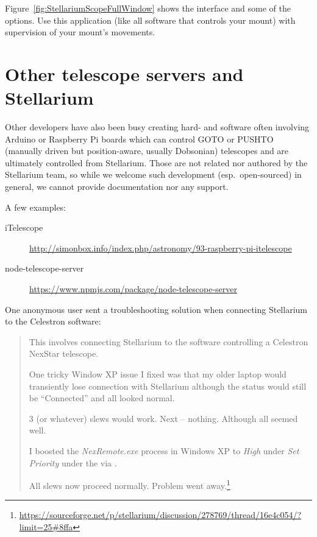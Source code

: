 Figure~\ref{fig:StellariumScopeFullWindow} shows the interface and
some of the options.  Use this application (like all software that
controls your mount) with supervision of your mount's movements.

\section{Other telescope servers and Stellarium}
\label{sec:plugins:TelescopeControl:Other}

Other developers have also been busy creating hard- and software often
involving Arduino or Raspberry Pi boards which can control GOTO or
PUSHTO (manually driven but position-aware, usually Dobsonian)
telescopes and are ultimately controlled from Stellarium. Those are
not related nor authored by the Stellarium team, so while we welcome
such development (esp.\ open-sourced) in general, we cannot provide
documentation nor any support.

A few examples:
\begin{description}
\item[iTelescope] \url{http://simonbox.info/index.php/astronomy/93-raspberry-pi-itelescope}
\item[node-telescope-server] \url{https://www.npmjs.com/package/node-telescope-server}
\end{description}

One anonymous user sent a troubleshooting solution when connecting Stellarium to the Celestron  software:
\begin{quote}
  This involves connecting Stellarium to the  software controlling a Celestron NexStar telescope.

  One tricky Window XP issue I fixed was that my older laptop would
  transiently lose connection with Stellarium although the status
  would still be ``Connected'' and all looked normal.

  3 (or whatever) slews would work. Next -- nothing. Although all
  seemed well.

  I boosted the \emph{NexRemote.exe} process in Windows XP to \emph{High} under
  \emph{Set Priority} under the  via
  .

  All slews now proceed normally. Problem went
  away.\footnote{\url{https://sourceforge.net/p/stellarium/discussion/278769/thread/16e4c054/?limit=25\#8ffa}}
\end{quote}


\newpage
